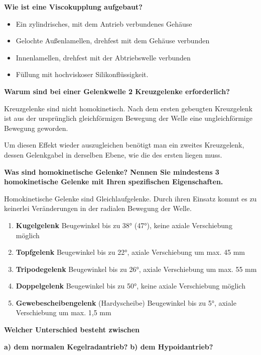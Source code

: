 \textbf{Wie ist eine Viscokupplung aufgebaut?}

\begin{itemize}
\item
  Ein zylindrisches, mit dem Antrieb verbundenes Gehäuse
\item
  Gelochte Außenlamellen, drehfest mit dem Gehäuse verbunden
\item
  Innenlamellen, drehfest mit der Abtriebswelle verbunden
\item
  Füllung mit hochviskoser Silikonflüssigkeit.
\end{itemize}

\textbf{Warum sind bei einer Gelenkwelle 2 Kreuzgelenke erforderlich?}

Kreuzgelenke sind nicht homokinetisch. Nach dem ersten gebeugten
Kreuzgelenk ist aus der ursprünglich gleichförmigen Bewegung der Welle
eine ungleichförmige Bewegung geworden.

Um diesen Effekt wieder auszugleichen benötigt man ein zweites
Kreuzgelenk, dessen Gelenkgabel in derselben Ebene, wie die des ersten
liegen muss.

\textbf{Was sind homokinetische Gelenke? Nennen Sie mindestens 3
homokinetische Gelenke mit Ihren spezifischen Eigenschaften.}

Homokinetische Gelenke sind Gleichlaufgelenke. Durch ihren Einsatz kommt
es zu keinerlei Veränderungen in der radialen Bewegung der Welle.

\begin{enumerate}
\item
  \textbf{Kugelgelenk} Beugewinkel bis zu 38° (47°), keine axiale
  Verschiebung möglich
\item
  \textbf{Topfgelenk} Beugewinkel bis zu 22°, axiale Verschiebung um
  max. 45 mm
\item
  \textbf{Tripodegelenk} Beugewinkel bis zu 26°, axiale Verschiebung um
  max. 55 mm
\item
  \textbf{Doppelgelenk} Beugewinkel bis zu 50°, keine axiale
  Verschiebung möglich
\item
  \textbf{Gewebescheibengelenk} (Hardyscheibe) Beugewinkel bis zu 5°,
  axiale Verschiebung um max. 1,5 mm
\end{enumerate}

\textbf{Welcher Unterschied besteht zwischen}

\textbf{a) dem normalen Kegelradantrieb?} \textbf{b) dem Hypoidantrieb?}

